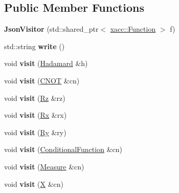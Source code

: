 \subsection*{Public Member Functions}
\begin{DoxyCompactItemize}
\item 
{\bfseries Json\+Visitor} (std\+::shared\+\_\+ptr$<$ \hyperlink{a00030}{xacc\+::\+Function} $>$ f)\hypertarget{a00044_a7b2bf70217828adf6457e3fee7e13056}{}\label{a00044_a7b2bf70217828adf6457e3fee7e13056}

\item 
std\+::string {\bfseries write} ()\hypertarget{a00044_a78e2b6c71755a0fed97de43e0b7edc82}{}\label{a00044_a78e2b6c71755a0fed97de43e0b7edc82}

\item 
void {\bfseries visit} (\hyperlink{a00036}{Hadamard} \&h)\hypertarget{a00044_afdebbabdbae5ecb3a508f02ffe056fd4}{}\label{a00044_afdebbabdbae5ecb3a508f02ffe056fd4}

\item 
void {\bfseries visit} (\hyperlink{a00019}{C\+N\+OT} \&cn)\hypertarget{a00044_a83c17c122c0e02242189b3564290f3e9}{}\label{a00044_a83c17c122c0e02242189b3564290f3e9}

\item 
void {\bfseries visit} (\hyperlink{a00063}{Rz} \&rz)\hypertarget{a00044_a76c3593f3933631c2dbca74b7b216534}{}\label{a00044_a76c3593f3933631c2dbca74b7b216534}

\item 
void {\bfseries visit} (\hyperlink{a00061}{Rx} \&rx)\hypertarget{a00044_ad73ac1911e894f315fcee802673a30da}{}\label{a00044_ad73ac1911e894f315fcee802673a30da}

\item 
void {\bfseries visit} (\hyperlink{a00062}{Ry} \&ry)\hypertarget{a00044_a0e744d9db4c2d16196b17f91a84f8767}{}\label{a00044_a0e744d9db4c2d16196b17f91a84f8767}

\item 
void {\bfseries visit} (\hyperlink{a00021}{Conditional\+Function} \&cn)\hypertarget{a00044_aea63f829d8c926e567ef6a09a0ca779e}{}\label{a00044_aea63f829d8c926e567ef6a09a0ca779e}

\item 
void {\bfseries visit} (\hyperlink{a00045}{Measure} \&cn)\hypertarget{a00044_a71a9c4b78152af3366f8ee93b2e4d9da}{}\label{a00044_a71a9c4b78152af3366f8ee93b2e4d9da}

\item 
void {\bfseries visit} (\hyperlink{a00070}{X} \&cn)\hypertarget{a00044_a2862d01b12da46374c16a3baf33bb4ca}{}\label{a00044_a2862d01b12da46374c16a3baf33bb4ca}


\end{DoxyCompactItemize}
